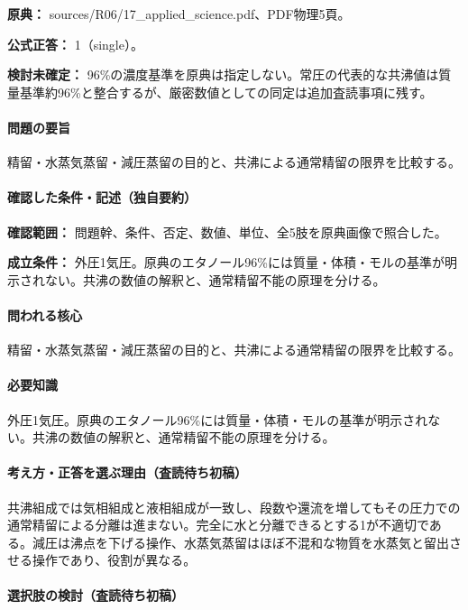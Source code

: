 \noindent\textbf{原典：} sources/R06/17\_applied\_science.pdf、PDF物理5頁。

\textbf{公式正答：} 1（single）。

\par\textbf{検討未確定：} 96\%の濃度基準を原典は指定しない。常圧の代表的な共沸値は質量基準約96\%と整合するが、厳密数値としての同定は追加査読事項に残す。

\paragraph{問題の要旨} 精留・水蒸気蒸留・減圧蒸留の目的と、共沸による通常精留の限界を比較する。

\paragraph{確認した条件・記述（独自要約）}\mbox{}\par

\noindent\textbf{確認範囲：} 問題幹、条件、否定、数値、単位、全5肢を原典画像で照合した。\par

\noindent\textbf{成立条件：} 外圧1気圧。原典のエタノール96\%には質量・体積・モルの基準が明示されない。共沸の数値の解釈と、通常精留不能の原理を分ける。\par

\paragraph{問われる核心} 精留・水蒸気蒸留・減圧蒸留の目的と、共沸による通常精留の限界を比較する。

\paragraph{必要知識} 外圧1気圧。原典のエタノール96\%には質量・体積・モルの基準が明示されない。共沸の数値の解釈と、通常精留不能の原理を分ける。

\paragraph{考え方・正答を選ぶ理由（査読待ち初稿）} 共沸組成では気相組成と液相組成が一致し、段数や還流を増してもその圧力での通常精留による分離は進まない。完全に水と分離できるとする1が不適切である。減圧は沸点を下げる操作、水蒸気蒸留はほぼ不混和な物質を水蒸気と留出させる操作であり、役割が異なる。

\paragraph{選択肢の検討（査読待ち初稿）}\mbox{}\par

